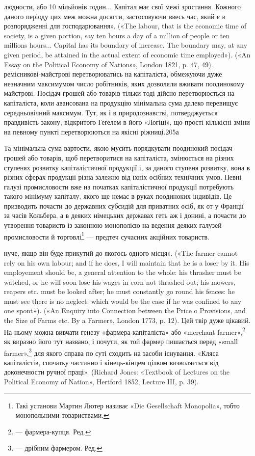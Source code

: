 людности, або 10 мільйонів годин... Капітал має свої межі зростання.
Кожного даного періоду цих меж можна досягти, застосовуючи ввесь
час, який є в розпорядженні для господарювання». («The labour, that
is the economic time of society, is a given portion, say ten hours a day of
a million of people or ten millions hours... Capital has its boundary of increase.
The boundary may, at any given period, be attained in the actual
extent of economic time employed»). («An Essay on the Political Economy
of Nations», London 1821, p. 47, 49).
ремісникові-майстрові перетворюватись на капіталіста, обмежуючи
дуже незначним максимумом число робітників, яких дозволяли
вживати поодинокому майстрові. Посідач грошей або товарів
тільки тоді дійсно перетворюється на капіталіста, коли авансована
на продукцію мінімальна сума далеко перевищує середньовічний
максимум. Тут, як і в природознавстві, потверджується
правдивість закону, відкритого Геґелем в його «Логіці»,
що прості кількісні зміни на певному пункті перетворюються
на якісні ріжниці.205а

Та мінімальна сума вартости, якою мусить порядкувати поодинокий
посідач грошей або товарів, щоб перетворитися на капіталіста,
змінюється на різних ступенях розвитку капіталістичної
продукції і, за даного ступеня розвитку, вона в різних сферах
продукції різна залежно від їхніх осібних технічних умов. Певні
галузі промисловости вже на початках капіталістичної продукції
потребують такого мінімуму капіталу, якого ще немає в руках
поодиноких індивідів. Це призводить почасти до державних субсидій
для приватних осіб, як от у Франції за часів Кольбера, а в
деяких німецьких державах геть аж і донині, а почасти до утворення
товариств із законною монополією на ведення деяких
галузей промисловости й торговлі\footnote{
Такі установи Мартин Лютер називає «Die Gesellschaft Monopolia»,
тобто монопольними товариствами.
} — предтеч сучасних акційних
товариств.

нуче, якщо він буде прикутий до якогось одного місця». («The farmer
cannot rely on his own labour; and if he does, I will maintain that he is
a loser by it. His employement should be, a general attention to the whole:
his thrasher must be watched, or he will soon lose his wages in corn not
thrashed out; his mowers, reapers etc. must be looked after; he must constantly
go round his fences: he must see there is no neglect; which would
be the case if he was confined to any one spont»). («An Enquiry into Connection
between the Price o Provisions, and the Size of Farms etc. By a
Farmer», London 1773, p. 12). Цей твір дуже цікавий. На ньому можна
вивчати генезу «фармера-капіталіста» або «merchant farmer»,\footnote*{
— фармера-купця. Ред.
} як виразно
його тут названо, і почути, як той фармер пишається перед «small
farmer»,\footnote*{
— дрібним фармером. Ред.
} для якого справа по суті сходить на засоби існування. «Кляса
капіталістів, спочатку частинно і кінець-кінцем цілком визволяється
від доконечности ручної праці». (Richard Jones: «Textbook of Lectures on
the Political Economy of Nation», Hertford 1852, Lecture III, p. 39).

